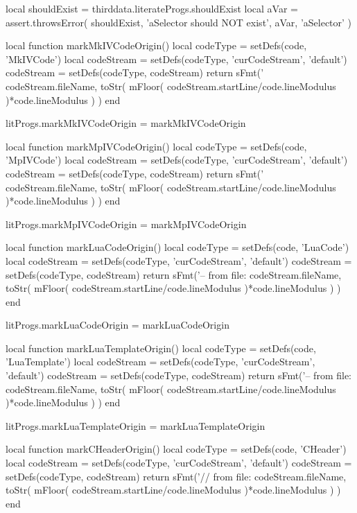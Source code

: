 \startLuaTest
  local shouldExist = thirddata.literateProgs.shouldExist
  local aVar = { }
  assert.throwsError(
    shouldExist,
    'aSelector should NOT exist',
    aVar,
    'aSelector'
  )
\stopLuaTest
\stopTestCase
\stopTestSuite

\startLuaCode
local function markMkIVCodeOrigin()
  local codeType       = setDefs(code, 'MkIVCode')
  local codeStream     = setDefs(codeType, 'curCodeStream', 'default')
  codeStream           = setDefs(codeType, codeStream)
  return sFmt('%
    codeStream.fileName,
    toStr(
      mFloor(
        codeStream.startLine/code.lineModulus
      )*code.lineModulus
    )
  )
end

litProgs.markMkIVCodeOrigin = markMkIVCodeOrigin

local function markMpIVCodeOrigin()
  local codeType       = setDefs(code, 'MpIVCode')
  local codeStream     = setDefs(codeType, 'curCodeStream', 'default')
  codeStream           = setDefs(codeType, codeStream)
  return sFmt('%
    codeStream.fileName,
    toStr(
      mFloor(
        codeStream.startLine/code.lineModulus
      )*code.lineModulus
    )
  )
end

litProgs.markMpIVCodeOrigin = markMpIVCodeOrigin

local function markLuaCodeOrigin()
  local codeType       = setDefs(code, 'LuaCode')
  local codeStream     = setDefs(codeType, 'curCodeStream', 'default')
  codeStream           = setDefs(codeType, codeStream)
  return sFmt('-- from file: %
    codeStream.fileName,
    toStr(
      mFloor(
        codeStream.startLine/code.lineModulus
      )*code.lineModulus
    )
  )
end

litProgs.markLuaCodeOrigin = markLuaCodeOrigin

local function markLuaTemplateOrigin()
  local codeType       = setDefs(code, 'LuaTemplate')
  local codeStream     = setDefs(codeType, 'curCodeStream', 'default')
  codeStream           = setDefs(codeType, codeStream)
  return sFmt('-- from file: %
    codeStream.fileName,
    toStr(
      mFloor(
        codeStream.startLine/code.lineModulus
      )*code.lineModulus
    )
  )
end

litProgs.markLuaTemplateOrigin = markLuaTemplateOrigin

local function markCHeaderOrigin()
  local codeType       = setDefs(code, 'CHeader')
  local codeStream     = setDefs(codeType, 'curCodeStream', 'default')
  codeStream           = setDefs(codeType, codeStream)
  return sFmt('// from file: %
    codeStream.fileName,
    toStr(
      mFloor(
        codeStream.startLine/code.lineModulus
      )*code.lineModulus
    )
  )
end

